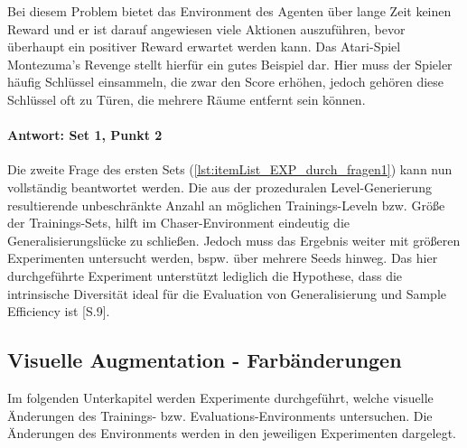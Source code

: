 Bei diesem Problem bietet das Environment des Agenten über lange Zeit keinen Reward und er ist darauf angewiesen viele Aktionen auszuführen, bevor überhaupt ein positiver Reward erwartet werden kann. Das Atari-Spiel \dq Montezuma's Revenge\dq{} stellt hierfür ein gutes Beispiel dar. Hier muss der Spieler häufig Schlüssel einsammeln, die zwar den Score erhöhen, jedoch gehören diese Schlüssel oft zu Türen, die mehrere Räume entfernt sein können.

\paragraph{Antwort: Set 1, Punkt 2}
Die zweite Frage des ersten Sets (\ref{lst:itemList_EXP_durch_fragen1}) kann nun vollständig beantwortet werden. Die aus der prozeduralen Level-Generierung resultierende unbeschränkte Anzahl an möglichen Trainings-Leveln bzw. Größe der Trainings-Sets, hilft im Chaser-Environment eindeutig die Generalisierungslücke zu schließen. Jedoch muss das Ergebnis weiter mit größeren Experimenten untersucht werden, bspw. über mehrere Seeds hinweg. Das hier durchgeführte Experiment unterstützt lediglich die Hypothese, dass die intrinsische Diversität ideal für die Evaluation von Generalisierung und Sample Efficiency ist \cite{cobbe2019procgen}[S.9]. 


\subsection{Visuelle Augmentation - Farbänderungen}\label{absch_EXP_durch_serie1}
Im folgenden Unterkapitel werden Experimente durchgeführt, welche visuelle Änderungen des Trainings- bzw. Evaluations-Environments untersuchen. Die Änderungen des Environments werden in den jeweiligen Experimenten dargelegt.

